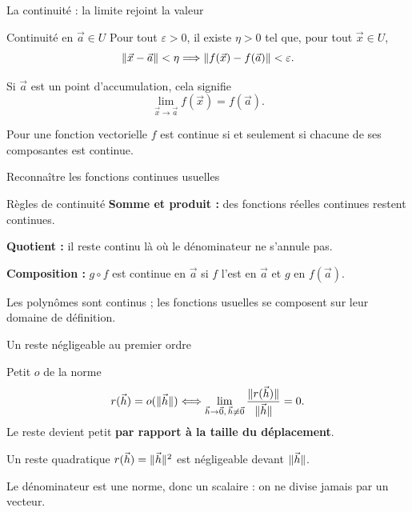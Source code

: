 \begin{frame}[t]{La continuité : la limite rejoint la valeur}
\coursanalyse
\begin{notion}{Continuité en $\vec a\in U$}
Pour tout $\varepsilon>0$, il existe $\eta>0$ tel que, pour tout $\vec x\in U$,
\[\lVert \vec x-\vec a\rVert<\eta\Longrightarrow\lVert f(\vec x)-f(\vec a)\rVert<\varepsilon.\]
\end{notion}
Si $\vec a$ est un point d'accumulation, cela signifie
\[\lim_{\vec x\to\vec a}f(\vec x)=f(\vec a).\]
\begin{resultat}{Pour une fonction vectorielle}
$f$ est continue si et seulement si chacune de ses composantes est continue.
\end{resultat}
\end{frame}

\begin{frame}[t]{Reconnaître les fonctions continues usuelles}
\coursanalyse
\begin{theoreme}{Règles de continuité}
\textbf{Somme et produit :} des fonctions réelles continues restent continues.

\medskip
\textbf{Quotient :} il reste continu là où le dénominateur ne s'annule pas.

\medskip
\textbf{Composition :} $g\circ f$ est continue en $\vec a$ si $f$ l'est en $\vec a$ et $g$ en $f(\vec a)$.
\end{theoreme}
\vfill Les polynômes sont continus ; les fonctions usuelles se composent sur leur domaine de définition.
\end{frame}

\begin{frame}[t]{Un reste négligeable au premier ordre}
\coursanalyse
\begin{notion}{Petit $o$ de la norme}
\[r(\vec h)=o(\lVert \vec h\rVert)\Longleftrightarrow
\lim_{\vec h\to\vec 0,\,\vec h\ne\vec 0}\frac{\lVert r(\vec h)\rVert}{\lVert \vec h\rVert}=0.\]
Le reste devient petit \textbf{par rapport à la taille du déplacement}.
\end{notion}
\begin{exemple}{Un reste quadratique}
$r(\vec h)=\lVert \vec h\rVert^2$ est négligeable devant $\lVert \vec h\rVert$.
\end{exemple}
\vfill Le dénominateur est une norme, donc un scalaire : on ne divise jamais par un vecteur.
\end{frame}

